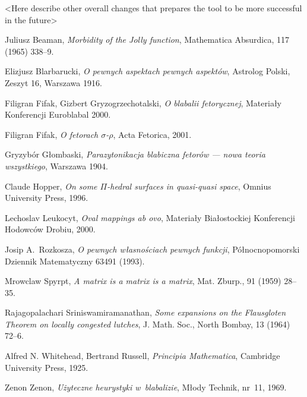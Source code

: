 \documentclass[licencjacka,en]{pracamgr}
\begin{document}
<Here describe other overall changes that prepares the tool to be more successful in the future>

\appendix

\begin{thebibliography}{99}

 Juliusz Beaman, \textit{Morbidity of the Jolly
    function}, Mathematica Absurdica, 117 (1965) 338--9.

 Elizjusz Blarbarucki, \textit{O pewnych
    aspektach pewnych aspektów}, Astrolog Polski, Zeszyt 16, Warszawa
  1916.

 Filigran Fifak, Gizbert Gryzogrzechotalski,
  \textit{O blabalii fetorycznej}, Materiały Konferencji Euroblabal
  2000.

 Filigran Fifak, \textit{O fetorach
    $\sigma$-$\rho$}, Acta Fetorica, 2001.

 Gryzybór Głombaski, \textit{Parazytonikacja
    blabiczna fetorów --- nowa teoria wszystkiego}, Warszawa 1904.

 Claude Hopper, \textit{On some $\Pi$-hedral
    surfaces in quasi-quasi space}, Omnius University Press, 1996.

 Lechoslav Leukocyt, \textit{Oval mappings ab ovo},
  Materiały Białostockiej Konferencji Hodowców Drobiu, 2000.

 Josip A.~Rozkosza, \textit{O pewnych własnościach
    pewnych funkcji}, Północnopomorski Dziennik Matematyczny 63491
  (1993).

 Mrowclaw Spyrpt, \textit{A matrix is a matrix
    is a matrix}, Mat. Zburp., 91 (1959) 28--35.

 Rajagopalachari Sriniswamiramanathan,
  \textit{Some expansions on the Flausgloten Theorem on locally
    congested lutches}, J. Math.  Soc., North Bombay, 13 (1964) 72--6.

 Alfred N. Whitehead, Bertrand Russell,
  \textit{Principia Mathematica}, Cambridge University Press, 1925.

 Zenon Zenon, \textit{Użyteczne heurystyki
    w~blabalizie}, Młody Technik, nr~11, 1969.

\end{thebibliography}
\end{document}
